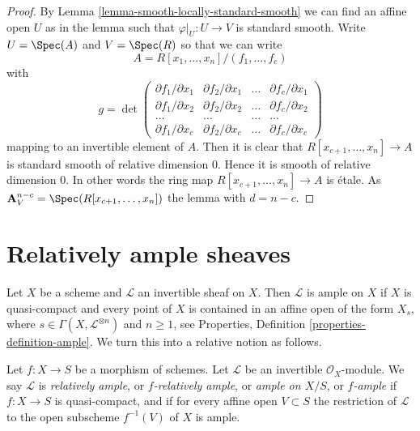 \begin{proof}
By
Lemma \ref{lemma-smooth-locally-standard-smooth}
we can find an affine open $U$ as in the lemma such that
$\varphi|_U : U \to V$ is standard smooth. Write
$U = \Spec(A)$ and $V = \Spec(R)$ so that we can write
$$
A = R[x_1, \ldots, x_n]/(f_1, \ldots, f_c)
$$
with
$$
g =
\det
\left(
\begin{matrix}
\partial f_1/\partial x_1 &
\partial f_2/\partial x_1 &
\ldots &
\partial f_c/\partial x_1 \\
\partial f_1/\partial x_2 &
\partial f_2/\partial x_2 &
\ldots &
\partial f_c/\partial x_2 \\
\ldots & \ldots & \ldots & \ldots \\
\partial f_1/\partial x_c &
\partial f_2/\partial x_c &
\ldots &
\partial f_c/\partial x_c
\end{matrix}
\right)
$$
mapping to an invertible element of $A$. Then it is clear that
$R[x_{c + 1}, \ldots, x_n] \to A$ is standard smooth of relative
dimension $0$. Hence it is smooth of relative dimension $0$.
In other words the ring map $R[x_{c + 1}, \ldots, x_n] \to A$
is \'etale. As $\mathbf{A}^{n - c}_V = \Spec(R[x_{c + 1}, \ldots, x_n])$
the lemma with $d = n - c$.
\end{proof}
















\section{Relatively ample sheaves}
\label{section-relatively-ample}

\noindent
Let $X$ be a scheme and $\mathcal{L}$ an invertible sheaf on $X$.
Then $\mathcal{L}$ is ample on $X$ if $X$ is quasi-compact and
every point of $X$ is contained in an affine open of the form
$X_s$, where $s \in \Gamma(X, \mathcal{L}^{\otimes n})$ and $n \geq 1$, see
Properties, Definition \ref{properties-definition-ample}.
We turn this into a relative notion as follows.

\begin{definition}
\label{definition-relatively-ample}
\begin{reference}
\cite[II Definition 4.6.1]{EGA}
\end{reference}
Let $f : X \to S$ be a morphism of schemes.
Let $\mathcal{L}$ be an invertible $\mathcal{O}_X$-module.
We say $\mathcal{L}$ is {\it relatively ample}, or {\it $f$-relatively ample},
or {\it ample on $X/S$}, or {\it $f$-ample} if $f : X \to S$
is quasi-compact, and if for every affine open $V \subset S$
the restriction of $\mathcal{L}$ to the open subscheme
$f^{-1}(V)$ of $X$ is ample.
\end{definition}

